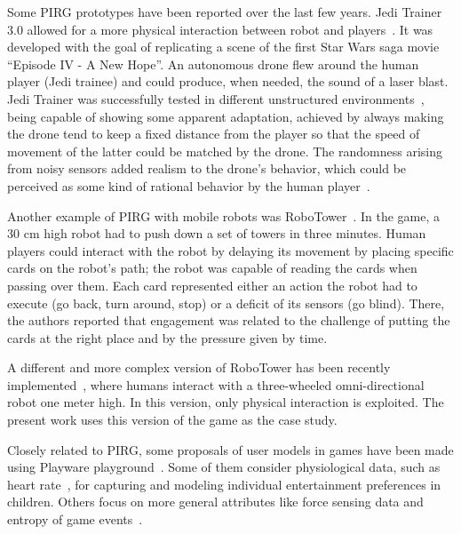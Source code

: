 Some PIRG prototypes have been reported over the last few years. Jedi Trainer 3.0 allowed for a more physical interaction between robot and players~\cite{martinoia_physically_2013}. It was developed with the goal of replicating a scene of the first Star Wars saga movie ``Episode IV - A New Hope''. An autonomous drone flew around the human player (Jedi trainee) and could produce, when needed, the sound of a laser blast. Jedi Trainer was successfully tested in different unstructured environments~\cite{bonarini_timing_2014}, being capable of showing some apparent adaptation, achieved by always making the drone tend to keep a fixed distance from the player so that the speed of movement of the latter could be matched by the drone. The randomness arising from noisy sensors added realism to the drone's behavior, which could be perceived as some kind of rational behavior by the human player~\cite{martinoia_physically_2013}.

Another example of PIRG with mobile robots was RoboTower~\cite{bonarini_timing_2014, martinoia_physically_2013}. In the game, a 30 cm high robot had to push down a set of towers in three minutes. Human players could interact with the robot by delaying its movement by placing specific cards on the robot's path; the robot was capable of reading the cards when passing over them. Each card represented either an action the robot had to execute (go back, turn around, stop) or a deficit of its sensors (go blind). There, the authors reported that engagement was related to the challenge of putting the cards at the right place and by the pressure given by time.

A different and more complex version of RoboTower has been recently implemented~\cite{oliveira_activity_2017, oliveira_modeling_2017}, where humans interact with a three-wheeled omni-directional robot one meter high. In this version, only physical interaction is exploited. The present work uses this version of the game as the case study.

Closely related to PIRG, some proposals of user models in games have been made using Playware playground~\cite{lund_playware_2005}. Some of them consider physiological data, such as heart rate~\cite{yannakakis_entertainment_2008}, for capturing and modeling individual entertainment preferences in children. Others focus on more general attributes like force sensing data and entropy of game events~\cite{yannakakis_modeling_2006}.

